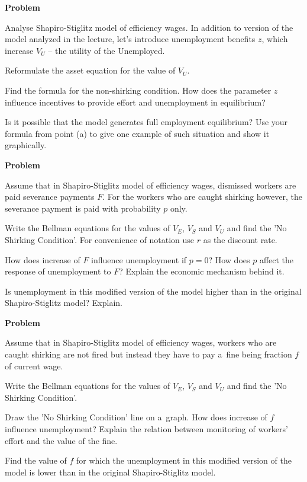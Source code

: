 \documentclass[a4paper, notitlepage, 11pt]{article}
\newcounter{zadlicz}[section]%
\newcommand{\tytul}[2]{\setcounter{equation}{0}\addtocounter{zadlicz}{1}\vspace{\abovedisplayskip}\noindent\textbf{#1\ \thezadlicz #2}}%
\begin{document}
\tytul{Problem}{}

\noindent%
Analyse Shapiro-Stiglitz model of efficiency wages. In addition to version of the model analyzed in the lecture, let's introduce unemployment benefits $z$, which increase $V_U$ -- the utility of the Unemployed.

\begin{wylicz}
\item Reformulate the asset equation for the value of $V_U$.
\item Find the formula for the non-shirking condition. How does the parameter $z$ influence incentives to provide effort and unemployment in equilibrium?
\item Is it possible that the model generates full employment equilibrium? Use your formula from point (a) to give one example of such situation and show it graphically.
\end{wylicz}

\tytul{Problem}{}

\noindent%
Assume that in Shapiro-Stiglitz model of efficiency wages, dismissed workers are paid severance payments $F$. For the workers who are caught shirking however, the severance payment is paid with probability $p$ only.

\begin{wylicz}
\item Write the Bellman equations for the values of $V_E$, $V_S$ and $V_U$ and find the 'No Shirking Condition'. For convenience of notation use $r$ as the discount rate.
\item How does increase of $F$ influence unemployment if $p=0$? How does $p$ affect the response of unemployment to $F$? Explain the economic mechanism behind it.
\item Is unemployment in this modified version of the model higher than in the original Shapiro-Stiglitz model? Explain.
\end{wylicz}

\tytul{Problem}{}

\noindent%
Assume that in Shapiro-Stiglitz model of efficiency wages, workers who are caught shirking are not fired but instead they have to pay a~fine being fraction $f$ of current wage.

\begin{wylicz}
\item Write the Bellman equations for the values of $V_E$, $V_S$ and $V_U$ and find the 'No Shirking Condition'.
\item Draw the 'No Shirking Condition' line on a~graph. How does increase of $f$ influence unemployment? Explain the relation between monitoring of workers' effort and the value of the fine.
\item Find the value of $f$ for which the unemployment in this modified version of the model is lower than in the original Shapiro-Stiglitz model.
\end{wylicz}
\end{document}
